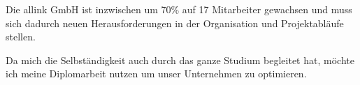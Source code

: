 Die allink GmbH ist inzwischen um 70\% auf 17 Mitarbeiter gewachsen und muss sich dadurch
neuen Herausforderungen in der Organisation und Projektabläufe stellen.

Da mich die Selbständigkeit auch durch das ganze Studium begleitet hat, möchte 
ich meine Diplomarbeit nutzen um unser Unternehmen zu optimieren.